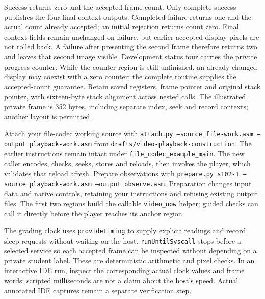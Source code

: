 Success returns zero and the accepted frame count. Only complete success publishes
the four final context outputs. Completed failure returns one and the actual count
already accepted; an initial rejection returns count zero. Final context fields
remain unchanged on failure, but earlier accepted display pixels are not rolled
back. A failure after presenting the second frame therefore returns two and leaves
that second image visible. Development status four carries the private progress counter. While the counter
region is still unfinished, an already changed display may coexist with a zero
counter; the complete routine supplies the accepted-count guarantee.
Retain saved registers, frame pointer and original stack pointer, with sixteen-byte
stack alignment across nested calls. The illustrated private frame is 352 bytes,
including separate index, seek and record contexts; another layout is permitted.

Attach your file-codec working source with \texttt{attach.py --source file-work.asm
  --output playback-work.asm} from \texttt{drafts/video-playback-construction}.
The earlier instructions remain intact under \texttt{file\_codec\_example\_main}.
The new caller encodes, checks, seeks, stores and reloads, then invokes the player,
which validates that reload afresh. Prepare observations with \texttt{prepare.py
  s102-1 --source playback-work.asm --output observe.asm}. Preparation changes input
data and native controls, retaining your instructions and refusing existing output
files. The first two regions build the callable \texttt{video\_now} helper; guided
checks can call it directly before the player reaches its anchor region.

The grading clock uses \texttt{provideTiming} to supply explicit readings and record
sleep requests without waiting on the host. \texttt{runUntilSyscall} stops before
a selected service so each accepted frame can be inspected without depending on a
private student label. These are deterministic arithmetic and pixel checks. In an
interactive IDE run, inspect the corresponding actual clock values and frame words;
scripted milliseconds are not a claim about the host's speed. Actual annotated IDE
captures remain a separate verification step.
